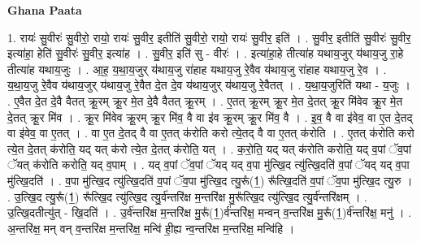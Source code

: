 \documentclass[17pt]{extarticle}
\begin{document}
\textbf{Ghana Paata } \newline

1. रायः॑ सु॒वीरः॑ सु॒वीरो॒ रायो॒ रायः॑ सु॒वीर॒ इतीति॑ सु॒वीरो॒ रायो॒ रायः॑ सु॒वीर॒ इति॑ । . सु॒वीर॒ इतीति॑ सु॒वीरः॑ सु॒वीर॒ इत्या॑हा॒ हेति॑ सु॒वीरः॑ सु॒वीर॒ इत्या॑ह । . सु॒वीर॒ इति॑ सु - वीरः॑ । . इत्या॑हा॒हे तीत्या॑ह यथाय॒जुर् य॑थाय॒जु रा॒हे तीत्या॑ह यथाय॒जुः । . आ॒ह॒ य॒था॒य॒जुर् य॑थाय॒जु रा॑हाह यथाय॒जु रे॒वैव य॑थाय॒जु रा॑हाह यथाय॒जु रे॒व । . य॒था॒य॒जु रे॒वैव य॑थाय॒जुर् य॑थाय॒जु रे॒वैत दे॒त दे॒व य॑थाय॒जुर् य॑थाय॒जु रे॒वैतत् । . य॒था॒य॒जुरिति॑ यथा - य॒जुः । . ए॒वैत दे॒त दे॒वै वैतत् क्रू॒रम् क्रू॒र मे॒त दे॒वै वैतत् क्रू॒रम् । . ए॒तत् क्रू॒रम् क्रू॒र मे॒त दे॒तत् क्रू॒र मि॑वेव क्रू॒र मे॒त दे॒तत् क्रू॒र मि॑व । . क्रू॒र मि॑वेव क्रू॒रम् क्रू॒र मि॑व॒ वै वा इ॑व क्रू॒रम् क्रू॒र मि॑व॒ वै । . इ॒व॒ वै वा इ॑वेव॒ वा ए॒त दे॒तद् वा इ॑वेव॒ वा ए॒तत् । . वा ए॒त दे॒तद् वै वा ए॒तत् क॑रोति करो त्ये॒तद् वै वा ए॒तत् क॑रोति । . ए॒तत् क॑रोति करो त्ये॒त दे॒तत् क॑रोति॒ यद् यत् क॑रो त्ये॒त दे॒तत् क॑रोति॒ यत् । . क॒रो॒ति॒ यद् यत् क॑रोति करोति॒ यद् व॒पां ॅव॒पां ॅयत् क॑रोति करोति॒ यद् व॒पाम् । . यद् व॒पां ॅव॒पां ॅयद् यद् व॒पा मु॑त्खि॒द त्यु॑त्खि॒दति॑ व॒पां ॅयद् यद् व॒पा मु॑त्खि॒दति॑ । . व॒पा मु॑त्खि॒द त्यु॑त्खि॒दति॑ व॒पां ॅव॒पा मु॑त्खि॒द त्यु॒रू᳚(1॒) रू᳚त्खि॒दति॑ व॒पां ॅव॒पा मु॑त्खि॒द त्यु॒रु । . उ॒त्खि॒द त्यु॒रू᳚(1॒) रू᳚त्खि॒द त्यु॑त्खि॒द त्यु॒र्व॑न्तरि॑क्ष म॒न्तरि॑क्ष मु॒रू᳚त्खि॒द त्यु॑त्खि॒द त्यु॒र्व॑न्तरि॑क्षम् । . उ॒त्खि॒दतीत्यु॑त् - खि॒दति॑ । . उ॒र्व॑न्तरि॑क्ष म॒न्तरि॑क्ष मु॒रू᳚(1॒)र्व॑न्तरि॑क्ष॒ मन्वन् व॒न्तरि॑क्ष मु॒रू᳚(1॒)र्व॑न्तरि॑क्ष॒ मनु॑ । . अ॒न्तरि॑क्ष॒ मन् वन् व॒न्तरि॑क्ष म॒न्तरि॑क्ष॒ मन्वि॑ ही॒ह्य न्व॒न्तरि॑क्ष म॒न्तरि॑क्ष॒ मन्वि॑हि । \newline
\end{document}
